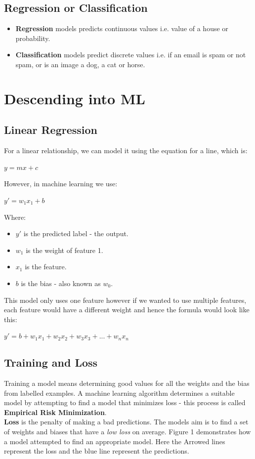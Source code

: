 \documentclass[12pt]{article}
\begin{document}
\subsection{Regression or Classification}
\begin{itemize}
	\item \textbf{Regression} models predicts continuous values i.e. value of a house or probability.
	\item \textbf{Classification} models predict discrete values i.e. if an email is spam or not spam, or is an image a dog, a cat or horse.
\end{itemize}
\section{Descending into ML}
\subsection{Linear Regression}
For a linear relationship, we can model it using the equation for a line, which is:
\begin{center}
$y = mx + c$
\end{center}
However, in machine learning we use:
\begin{center}
$y' = w_1x_1 + b$
\end{center}
Where:
\begin{itemize}
	\item $y'$ is the predicted label - the output.
	\item $w_1$ is the weight of feature 1.
	\item $x_1$ is the feature.
	\item $b$ is the bias - also known as $w_0$.
\end{itemize}

This model only uses one feature however if we wanted to use multiple features, each feature would have a different weight and hence the formula would look like this:
\begin{center}
$y' = b + w_1x_1 + w_2x_2 + w_3x_3 + ... + w_nx_n$
\end{center}
\subsection{Training and Loss}
Training a model means determining good values for all the weights and the bias from labelled examples. A machine learning algorithm determines a suitable model by attempting to find a model that minimizes loss - this process is called \textbf{Empirical Risk Minimization}.
\\ \textbf{Loss} is the penalty of making a bad predictions. The models aim is to find a set of weights and biases that have a \textit{low loss} on average. Figure 1 demonstrates how a model attempted to find an appropriate model. Here the Arrowed lines represent the loss and the blue line represent the predictions.
\end{document}
